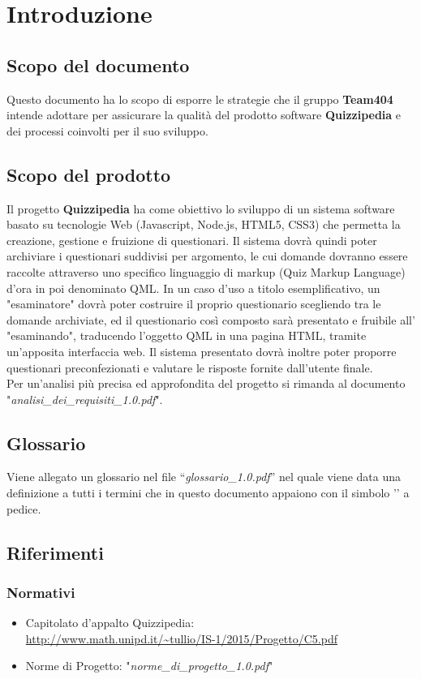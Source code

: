 \documentclass[a4paper,11pt]{article}
\begin{document}
	\newpage
	\section{Introduzione}
	\subsection{Scopo del documento}
	Questo documento ha lo scopo di esporre le strategie che il gruppo \textbf{Team404} intende adottare per assicurare la qualità del prodotto software \textbf{Quizzipedia} e dei processi coinvolti per il suo sviluppo.
	
	
	\subsection{Scopo del prodotto}
	Il progetto \textbf{Quizzipedia} ha come obiettivo lo sviluppo di un sistema software basato su tecnologie Web (Javascript\addglos, Node.js\addglos, HTML5\addglos, CSS3\addglos) che permetta la creazione, gestione e fruizione di questionari. Il sistema dovrà quindi poter archiviare i questionari suddivisi per argomento, le cui domande dovranno essere raccolte attraverso uno specifico linguaggio di markup (Quiz Markup Language) d'ora in poi denominato QML\addglos. In un caso d'uso a titolo esemplificativo, un "esaminatore" dovrà poter costruire il proprio questionario scegliendo tra le domande archiviate, ed il questionario così composto sarà presentato e fruibile all' "esaminando", traducendo l'oggetto QML in una pagina HTML\addglos, tramite un'apposita interfaccia web. Il sistema presentato dovrà inoltre poter proporre questionari preconfezionati e valutare le risposte fornite dall'utente finale.
	\\
	Per un'analisi più precisa ed approfondita del progetto si rimanda al documento\\ "\textit{analisi\_dei\_requisiti\_1.0.pdf}".
	\subsection{Glossario}
	Viene allegato un glossario nel file ``\textit{glossario\_1.0.pdf}'' nel quale viene data una definizione a tutti i termini che in questo documento appaiono con il simbolo '\addglos' a pedice.
	\newpage
	\subsection{Riferimenti}
		\subsubsection{Normativi}
		\begin{itemize}
			\item Capitolato d'appalto Quizzipedia:\\
			\url{http://www.math.unipd.it/~tullio/IS-1/2015/Progetto/C5.pdf}
			\item Norme di Progetto: "\textit{norme\_di\_progetto\_1.0.pdf}"
		\end{itemize}
\end{document}
